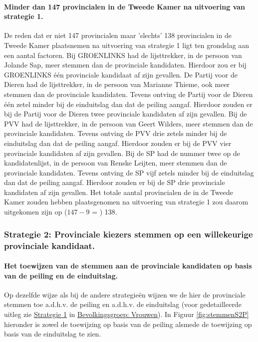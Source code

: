 \paragraph{Minder dan 147 provincialen in de Tweede Kamer na uitvoering van strategie 1.}
De reden dat er niet 147 provincialen maar 'slechts' 138 provincialen in de Tweede Kamer plaatsnemen na uitvoering van strategie 1 ligt ten grondslag aan een aantal factoren. Bij GROENLINKS had de lijsttrekker, in de persoon van Jolande 
Sap, meer stemmen dan de provinciale kandidaten. Hierdoor zou er bij GROENLINKS één provinciale kandidaat af zijn gevallen. De Partij voor de Dieren had de lijsttrekker, in de persoon van Marianne Thieme, ook meer stemmen dan de provinciale kandidaten. Tevens ontving de Partij voor de Dieren één zetel minder bij de einduitslag dan dat de peiling aangaf. Hierdoor zouden er bij de Partij voor de Dieren twee provinciale kandidaten af zijn gevallen. Bij de PVV had de lijsttrekker, in de persoon van Geert Wilders, meer stemmen dan de provinciale kandidaten. Tevens ontving de PVV drie zetels minder bij de einduitslag dan dat de peiling aangaf. Hierdoor zouden er bij de PVV vier provinciale kandidaten af zijn gevallen. Bij de SP had de nummer twee op de kandidatenlijst, in de persoon van Renske Leijten, meer stemmen dan de provinciale kandidaten. Tevens ontving de SP vijf zetels minder bij de einduitslag dan dat de peiling aangaf. Hierdoor zouden er bij de SP drie provinciale kandidaten af zijn gevallen. Het totale aantal provincialen de in de Tweede Kamer zouden hebben plaatsgenomen na uitvoering van strategie 1 zou daarom uitgekomen zijn op ($147-9$ = ) 138.







\subsubsection{Strategie 2: Provinciale kiezers stemmen op een willekeurige provinciale kandidaat.}

\paragraph{Het toewijzen van de stemmen aan de provinciale kandidaten op basis van de peiling en de einduitslag.}
Op dezelfde wijze als bij de andere strategie\"{e}n wijzen we de hier de provinciale stemmen toe a.d.h.v. de peiling en a.d.h.v. de einduitslag (voor gedetailleerde uitleg zie \hyperref[S1V]{Strategie 1} in \hyperref[vrouwen]{Bevolkingsgroep: Vrouwen}). In Figuur \ref{fig:stemmenS2P} hieronder is zowel de toewijzing op basis van de peiling alsmede de toewijzing op basis van de einduitslag te zien.


